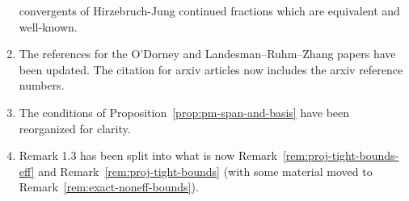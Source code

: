\documentclass[10 pt]{amsart}
\theoremstyle{plain}
\theoremstyle{definition}
\theoremstyle{remark}
\numberwithin{equation}{section}
\begin{document}
\begin{enumerate}
convergents of Hirzebruch-Jung continued fractions which are equivalent and
well-known.
\item The references for the O'Dorney and Landesman--Ruhm--Zhang papers have been updated. The citation for arxiv articles now includes the arxiv reference numbers.
\item The conditions of Proposition~\autoref{prop:pm-span-and-basis} have been reorganized for clarity.
\item Remark 1.3 has been split into what is now Remark~\autoref{rem:proj-tight-bounds-eff} and Remark~\autoref{rem:proj-tight-bounds} (with
some material moved to Remark~\autoref{rem:exact-noneff-bounds}).

\end{enumerate}
\end{document}
